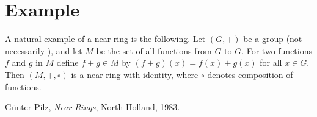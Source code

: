 \documentclass[12pt]{article}
\begin{document}
\section*{Example}

A natural example of a near-ring is the following. Let $(G,+)$ be a group (not necessarily ), and let $M$ be the set of all functions from $G$ to $G$. For two functions $f$ and $g$ in $M$ define $f+g\in M$ by $(f+g)(x)=f(x)+g(x)$ for all $x\in G$. Then $(M,+,\circ)$ is a near-ring with identity, where $\circ$ denotes composition of functions.

\begin{thebibliography}{9}
 G\"unter Pilz,
 {\it Near-Rings},
 North-Holland, 1983.
\end{thebibliography}
\end{document}
